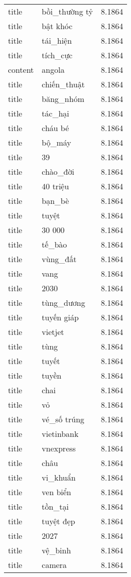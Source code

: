 \documentclass{article}
\begin{document}
\begin{tabular}{lll}
title & bồi\_thường tỷ & 8.1864\\
title & bật khóc & 8.1864\\
title & tái\_hiện & 8.1864\\
title & tích\_cực & 8.1864\\
content & angola & 8.1864\\
title & chiến\_thuật & 8.1864\\
title & băng\_nhóm & 8.1864\\
title & tác\_hại & 8.1864\\
title & cháu bé & 8.1864\\
title & bộ\_máy & 8.1864\\
title & 39 & 8.1864\\
title & chào\_đời & 8.1864\\
title & 40 triệu & 8.1864\\
title & bạn\_bè & 8.1864\\
title & tuyệt & 8.1864\\
title & 30 000 & 8.1864\\
title & tế\_bào & 8.1864\\
title & vùng\_đất & 8.1864\\
title & vang & 8.1864\\
title & 2030 & 8.1864\\
title & tùng\_dương & 8.1864\\
title & tuyến giáp & 8.1864\\
title & vietjet & 8.1864\\
title & tùng & 8.1864\\
title & tuyết & 8.1864\\
title & tuyền & 8.1864\\
title & chai & 8.1864\\
title & vỏ & 8.1864\\
title & vé\_số trúng & 8.1864\\
title & vietinbank & 8.1864\\
title & vnexpress & 8.1864\\
title & châu & 8.1864\\
title & vi\_khuẩn & 8.1864\\
title & ven biển & 8.1864\\
title & tồn\_tại & 8.1864\\
title & tuyệt đẹp & 8.1864\\
title & 2027 & 8.1864\\
title & vệ\_binh & 8.1864\\
title & camera & 8.1864\\

\end{tabular}
\end{document}
